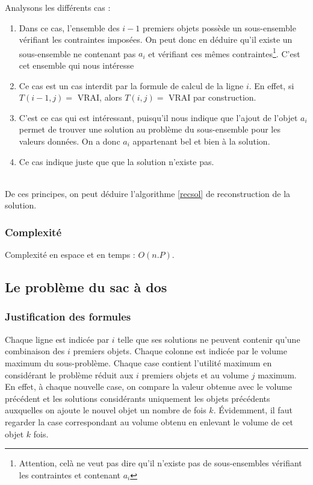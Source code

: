 Analysons les différents cas : \begin{enumerate}
	\item Dans ce cas, l'ensemble des $i-1$ premiers objets possède un sous-ensemble vérifiant les
		contraintes imposées. On peut donc en déduire qu'il existe un sous-ensemble ne contenant pas
		$a_i$ et vérifiant ces mêmes contraintes\footnote{Attention, celà ne veut pas dire qu'il
		n'existe pas de sous-ensembles vérifiant les contraintes et contenant $a_i$}. C'est cet ensemble
		qui nous intéresse
	\item Ce cas est un cas interdit par la formule de calcul de la ligne $i$. En effet, si $T(i-1, j)
		=$ VRAI, alors $T(i,j) =$ VRAI par construction.
	\item C'est ce cas qui est intéressant, puisqu'il nous indique que l'ajout de l'objet $a_i$ permet
		de trouver une solution au problème du sous-ensemble pour les valeurs données. On a donc $a_i$
		appartenant bel et bien à la solution.
	\item Ce cas indique juste que que la solution n'existe pas.
\end{enumerate}
~\\
De ces principes, on peut déduire l'algorithme \ref{recsol} de reconstruction de la solution.

\subsubsection{Complexité}
Complexité en espace et en temps : $O(n.P)$.



\subsection{Le problème du sac à dos}



\subsubsection{Justification des formules}
Chaque ligne est indicée par $i$ telle que ses solutions ne peuvent contenir qu'une combinaison des $i$ premiers objets. Chaque colonne est indicée par le volume maximum du sous-problème. Chaque case contient l'utilité maximum en considérant le problème réduit aux $i$ premiers objets et au volume $j$ maximum.
En effet, à chaque nouvelle case, on compare la valeur obtenue avec le volume précédent et les solutions considérants uniquement les objets précédents auxquelles on ajoute le nouvel objet un nombre de fois $k$. Évidemment, il faut regarder la case correspondant au volume obtenu en enlevant le volume de cet objet $k$ fois.

